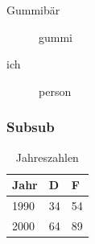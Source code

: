 \documentclass{scrartcl}
\begin{document}
\begin{description}
 \item[Gummibär] gummi
 \item[ich] person
\end{description}
\subsubsection{Subsub}
\begin{table}[h]
 \centering
 \begin{tabular}{l|ll}
  \textbf{Jahr} & \textbf{D} & \textbf{F}
  \\  \hline
  1990          & 34         & 54         \\
  2000          & 64         & 89
 \end{tabular}
 \caption{Jahreszahlen}
 \label{tbl:einwohner}
\end{table}
\end{document}
